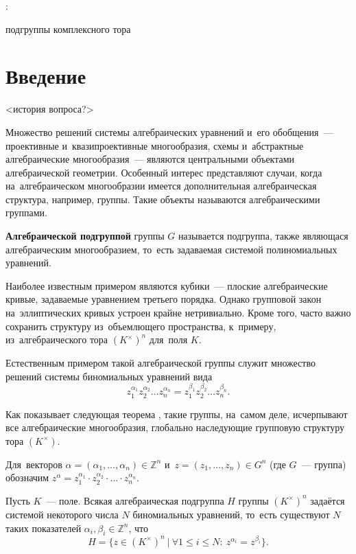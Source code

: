 \documentclass{article}
\begin{document}

\begin{titlepage}
  \centering

  {:\vspace{0.2cm}}\par
  { подгруппы комплексного тора}
\end{titlepage}

\tableofcontents

\section{Введение}

<история вопроса?>

Множество решений системы алгебраических уравнений и его обобщения~— проективные и~квазипроективные многообразия,
схемы и~абстрактные алгебраические многообразия~— являются центральными объектами алгебраической геометрии.
Особенный интерес представляют случаи, когда на~алгебраическом многообразии имеется дополнительная алгебраическая структура,
например, группы. Такие объекты называются алгебраическими группами.

\textbf{Алгебраической подгруппой} группы $G$ называется подгруппа, также являющася
алгебраическим многообразием, то~есть задаваемая системой полиномиальных уравнений.

Наиболее известным примером являются кубики~— плоские алгебраические кривые, задаваемые уравнением третьего порядка.
Однако групповой закон на~эллиптических кривых устроен крайне нетривиально. Кроме того, часто важно сохранить структуру из~объемлющего пространства,
к~примеру, из~алгебраического тора $(K^\times)^n$ для~поля $K$.

Естественным примером такой алгебраической группы служит множество решений системы биномиальных уравнений вида
$$
    z_1^{\alpha_1} z_2^{\alpha_2} \ldots z_n^{\alpha_n} = z_1^{\beta_1} z_2^{\beta_2} \ldots z_n^{\beta_n}.
$$

Как показывает следующая теорема \cite{Schm94}, такие группы, на~самом деле, исчерпывают все алгебраические многообразия,
глобально наследующие групповую структуру тора $(K^\times)$.

Для~векторов $\alpha = (\alpha_1, \ldots, \alpha_n) \in \mathbb{Z}^n$ и~$z = (z_1, \ldots, z_n) \in G^n$ (где $G$~— группа)
обозначим $z^\alpha = z_1^{\alpha_1} \cdot z_2^{\alpha_2} \cdot \ldots \cdot z_n^{\alpha_n}$.

\begin{theorem*}[Шмидт]
    Пусть $K$~— поле. Всякая алгебраическая подгруппа $H$ группы $(K^{\times})^n$ задаётся
    системой некоторого числа $N$ биномиальных уравнений, то~есть существуют $N$ таких показателей $\alpha_i, \beta_i \in \mathbb{Z}^n$, что
    $$
        H = \{ z \in (K^{\times})^n\ |\ \forall 1 \leq i \leq N{:}\ z^{\alpha_i} = z^{\beta_i} \}.
    $$
\end{theorem*}
\end{document}
